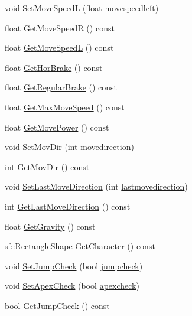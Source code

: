 \begin{DoxyCompactItemize}
void \hyperlink{classPlayerObject_a60999058bc5ed47cbbd52c468a400c5f}{Set\+Move\+SpeedL} (float \hyperlink{classPlayerObject_a0215c8600251b36a27d49bd6b01d34bb}{movespeedleft})
\item 
float \hyperlink{classPlayerObject_a9cbba4823a54769e65e437883897f7ef}{Get\+Move\+SpeedR} () const 
\item 
float \hyperlink{classPlayerObject_a14c7cacdcf3fc748e18e1ea5968f794a}{Get\+Move\+SpeedL} () const 
\item 
float \hyperlink{classPlayerObject_a4a519b15f12e06aa35ae9796c30fac08}{Get\+Hor\+Brake} () const 
\item 
float \hyperlink{classPlayerObject_a7d3bf55fb40eb92f4cea3d11766ca4e3}{Get\+Regular\+Brake} () const 
\item 
float \hyperlink{classPlayerObject_a13568f0d8efb4863be25aed36e0250a3}{Get\+Max\+Move\+Speed} () const 
\item 
float \hyperlink{classPlayerObject_a0e3039ff401d366e2acd4e3c04577e8a}{Get\+Move\+Power} () const 
\item 
void \hyperlink{classPlayerObject_a6f79723dde4a3eccdd819213114e52a3}{Set\+Mov\+Dir} (int \hyperlink{classPlayerObject_a1f0041d3a3195f684e002534329afdd2}{movedirection})
\item 
int \hyperlink{classPlayerObject_a6d7441e0284e6af65a064f5d9781a7a9}{Get\+Mov\+Dir} () const 
\item 
void \hyperlink{classPlayerObject_a75951d9991393f08e478607deb7f19a4}{Set\+Last\+Move\+Direction} (int \hyperlink{classPlayerObject_a59b667f647f5e3c5e6fbb93ca0f69a4d}{lastmovedirection})
\item 
int \hyperlink{classPlayerObject_aa41270fe17f41bf4ce804048b5dff594}{Get\+Last\+Move\+Direction} () const 
\item 
float \hyperlink{classPlayerObject_a6eeb8a060c9d5b6b4ca0104bf77aa346}{Get\+Gravity} () const 
\item 
sf\+::\+Rectangle\+Shape \hyperlink{classPlayerObject_ac4250fb9f8cc001a6641c63478722b7e}{Get\+Character} () const 
\item 
void \hyperlink{classPlayerObject_a1084ab4b57deee26ae98a131be9fb9ad}{Set\+Jump\+Check} (bool \hyperlink{classPlayerObject_a4b6f9ec15a3af10d75aab0f4e4211b09}{jumpcheck})
\item 
void \hyperlink{classPlayerObject_a6cd0c1faaf0d2cd1749d11a7e9e20ff8}{Set\+Apex\+Check} (bool \hyperlink{classPlayerObject_a47a3eb9e0b7df90a470ac69a59bb2fbe}{apexcheck})
\item 
bool \hyperlink{classPlayerObject_a203e254033dbe429d05f6c022994a824}{Get\+Jump\+Check} () const 

\end{DoxyCompactItemize}
